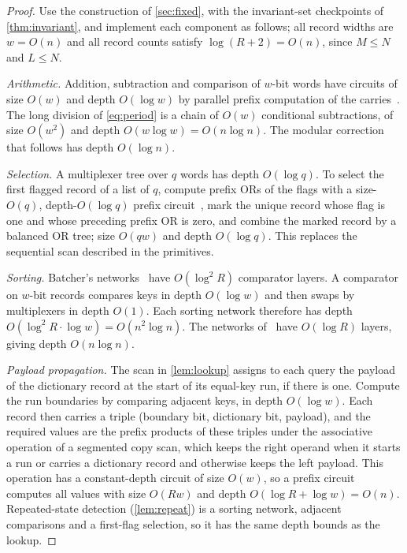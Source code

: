 \documentclass[11pt]{article}
\theoremstyle{definition}
\theoremstyle{remark}
\numberwithin{equation}{section}
\begin{document}
\begin{proof}
Use the construction of \cref{sec:fixed}, with the invariant-set
checkpoints of \cref{thm:invariant}, and implement each component as
follows; all record widths are $w=O(n)$ and all record counts satisfy
$\log(R+2)=O(n)$, since $M\leq N$ and $L\leq N$.

\emph{Arithmetic.}  Addition, subtraction and comparison of $w$-bit
words have circuits of size $O(w)$ and depth $O(\log w)$ by parallel
prefix computation of the carries~\cite{LF80}.  The long division of
\cref{eq:period} is a chain of $O(w)$ conditional subtractions, of size
$O(w^2)$ and depth $O(w\log w)=O(n\log n)$.  The modular correction that
follows has depth $O(\log n)$.

\emph{Selection.}  A multiplexer tree over $q$ words has depth
$O(\log q)$.  To select the first flagged record of a list of $q$, compute
prefix ORs of the flags with a size-$O(q)$, depth-$O(\log q)$ prefix
circuit~\cite{LF80}, mark the unique record whose flag is one and whose
preceding prefix OR is zero, and combine the marked record by a balanced
OR tree; size $O(qw)$ and depth $O(\log q)$.  This replaces the
sequential scan described in the primitives.

\emph{Sorting.}  Batcher's networks~\cite{Batcher68} have
$O(\log^2R)$ comparator layers.  A comparator on $w$-bit records
compares keys in depth $O(\log w)$ and then swaps by multiplexers in depth
$O(1)$.  Each sorting network therefore has depth
$O(\log^2R\cdot\log w)=O(n^2\log n)$.  The networks of~\cite{AKS83} have
$O(\log R)$ layers, giving depth $O(n\log n)$.

\emph{Payload propagation.}  The scan in \cref{lem:lookup} assigns to each
query the payload of the dictionary record at the start of its equal-key
run, if there is one.  Compute the run boundaries by comparing adjacent
keys, in depth $O(\log w)$.  Each record then carries a triple
(boundary bit, dictionary bit, payload), and the required values are the
prefix products of these triples under the associative operation of a
segmented copy scan, which keeps the right operand when it starts a run
or carries a dictionary record and otherwise keeps the left payload.  This
operation has a constant-depth circuit of size $O(w)$, so a prefix
circuit~\cite{LF80} computes all values with size $O(Rw)$ and depth
$O(\log R+\log w)=O(n)$.  Repeated-state detection (\cref{lem:repeat}) is a
sorting network, adjacent comparisons and a first-flag selection, so it
has the same depth bounds as the lookup.


\end{proof}
\end{document}

